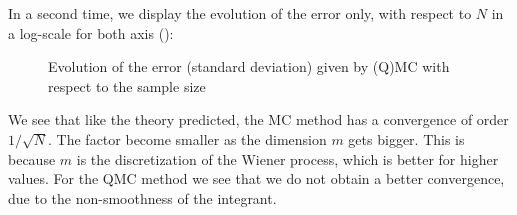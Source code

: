 \documentclass[a4paper]{article}
\theoremstyle{definition}
\theoremstyle{remark}
\begin{document}
 In a second time, we display the evolution of the error only, with respect to $N$ in a log-scale for both axis ():
\begin{figure}[H] 
    \caption{Evolution of the error (standard deviation) given by (Q)MC with respect to the sample size}
    \label{fig:q1error}
\end{figure}
We see that like the theory predicted, the MC method has a convergence of order $1/\sqrt{N}$. The factor become smaller as the dimension $m$ gets bigger. This is because $m$ is the discretization of the Wiener process, which is better for higher values. For the QMC method we see that we do not obtain a better convergence, due to the non-smoothness of the integrant.
\end{document}
